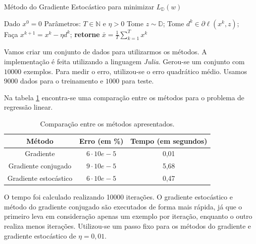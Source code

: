 \documentclass[
	12pt,				%
    oneside,			%
	a4paper,			%
	english,			%
	french,				%
	spanish,			%
	brazil,				%
	]{abntex2}
\begin{document}
            \begin{algorithm}[ht]
                \caption{Método do Gradiente Estocástico para minimizar $L_\mathbb{D}(w)$}
                \label{alg:sgdrisk}
                \begin{algorithmic}[1]
                    \State Dado $x^0 = 0$
                    \State Parâmetros: $T \in \mathbb{N}$ e $\eta > 0$
                        \State Tome $z \sim \mathbb{D}$;
                        \State Tome $d^k \in \partial \ell(x^k,z)$;
                        \State Faça $x^{k+1} = x^k - \eta d^k$;
                    \EndFor
                    \State \textbf{retorne} $\bar{x} = \frac{1}{T}\sum_{k=1}^{T} x^k$
                \end{algorithmic}
            \end{algorithm}

            Vamos criar um conjunto de dados para utilizarmos os métodos. A implementação é feita utilizando a linguagem \emph{Julia}. Gerou-se um conjunto com $10000$ exemplos. Para medir o erro, utilizou-se o erro quadrático médio. Usamos $9000$ dados para o treinamento e $1000$ para teste.


            Na tabela \ref{tab:reggd} encontra-se uma comparação entre os métodos para o problema de regressão linear.
            \begin{table}[ht]
                \centering
                \caption{Comparação entre os métodos apresentados.}
                \label{tab:reggd}
                \begin{tabular}{@{}ccc@{}}
                \toprule
                \textbf{Método}       & \textbf{Erro (em \%)} & \textbf{Tempo (em segundos)} \\ \midrule
                Gradiente             & $6\cdot 10e-5$        & 0,01             \\
                Gradiente conjugado   & $9\cdot 10e-5$        & 5,68              \\
                Gradiente estocástico & $6\cdot 10e-5$        & 0,47               \\ \bottomrule
                \end{tabular}
            \end{table}
            O tempo foi calculado realizando 10000 iterações. O gradiente estocástico e método do gradiente conjugado são executados de forma mais rápida, já que o primeiro leva em consideração apenas um exemplo por iteração, enquanto o outro realiza menos iterações. Utilizou-se um passo fixo para os métodos do gradiente e gradiente estocástico de $\eta = 0,01$.
\end{document}
